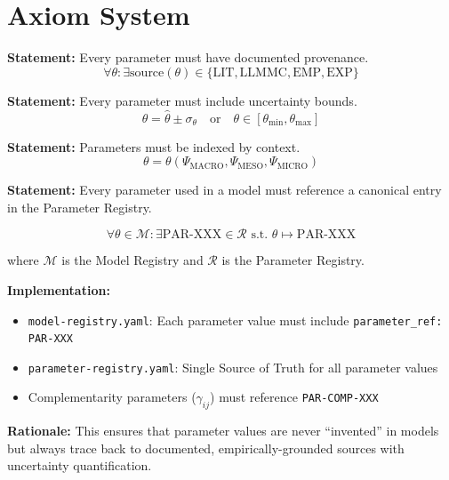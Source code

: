 \section{Axiom System}
\label{sec:where-axioms}

\begin{tcolorbox}[colback=gray!5!white, colframe=gray!75!black,
    title=Axiom PAR-1: Provenance Requirement]
\textbf{Statement:} Every parameter must have documented provenance.
\begin{equation}
\forall \theta: \exists \text{source}(\theta) \in \{\text{LIT}, \text{LLMMC}, \text{EMP}, \text{EXP}\}
\end{equation}
\end{tcolorbox}

\begin{tcolorbox}[colback=gray!5!white, colframe=gray!75!black,
    title=Axiom PAR-2: Uncertainty Quantification]
\textbf{Statement:} Every parameter must include uncertainty bounds.
\begin{equation}
\theta = \hat{\theta} \pm \sigma_{\theta} \quad \text{or} \quad \theta \in [\theta_{\min}, \theta_{\max}]
\end{equation}
\end{tcolorbox}

\begin{tcolorbox}[colback=gray!5!white, colframe=gray!75!black,
    title=Axiom PAR-3: Context Indexing]
\textbf{Statement:} Parameters must be indexed by context.
\begin{equation}
\theta = \theta(\Psi_{\text{MACRO}}, \Psi_{\text{MESO}}, \Psi_{\text{MICRO}})
\end{equation}
\end{tcolorbox}

\begin{tcolorbox}[colback=red!5!white, colframe=red!75!black,
    title=Axiom PAR-4: Referential Integrity]
\textbf{Statement:} Every parameter used in a model must reference a canonical entry in the Parameter Registry.

\begin{equation}
\forall \theta \in \mathcal{M}: \exists \text{PAR-XXX} \in \mathcal{R} \text{ s.t. } \theta \mapsto \text{PAR-XXX}
\end{equation}

where $\mathcal{M}$ is the Model Registry and $\mathcal{R}$ is the Parameter Registry.

\textbf{Implementation:}
\begin{itemize}[nosep]
\item \texttt{model-registry.yaml}: Each parameter value must include \texttt{parameter\_ref: PAR-XXX}
\item \texttt{parameter-registry.yaml}: Single Source of Truth for all parameter values
\item Complementarity parameters ($\gamma_{ij}$) must reference \texttt{PAR-COMP-XXX}
\end{itemize}

\textbf{Rationale:} This ensures that parameter values are never ``invented'' in models but always trace back to documented, empirically-grounded sources with uncertainty quantification.
\end{tcolorbox}

